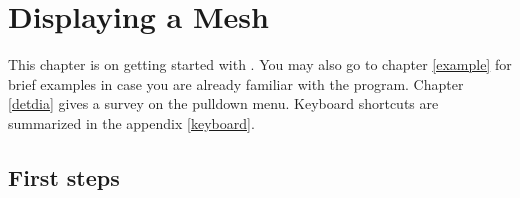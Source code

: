 \chapter{Displaying a Mesh}
\label{chap:display}

This chapter is on getting started with \GigaMesh\!. 
You may also go to chapter \ref{example} for brief examples in case you are already familiar with the program. 
Chapter \ref{detdia} gives a survey on the pulldown menu.
Keyboard shortcuts are summarized in the appendix \ref{keyboard}.

\section{First steps}

